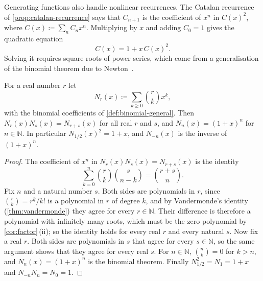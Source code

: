 Generating functions also handle nonlinear recurrences. The Catalan recurrence of \cref{prop:catalan-recurrence} says that $C_{n+1}$ is the coefficient of $x^n$ in $C(x)^2$, where $C(x)\coloneqq\sum_nC_nx^n$. Multiplying by $x$ and adding $C_0=1$ gives the quadratic equation
\begin{equation}
C(x)=1+x\,C(x)^2 .
\label{eq:catalan-gf}
\end{equation}
Solving it requires square roots of power series, which come from a generalisation of the binomial theorem due to Newton~\cite[Sects.~5.1 and~5.4]{graham1994concrete}.

\begin{theorem}
\label{thm:newton}
For a real number $r$ let
\[
N_r(x)\coloneqq\sum_{k\ge0}\binom rkx^k ,
\]
with the binomial coefficients of \cref{def:binomial-general}. Then $N_r(x)N_s(x)=N_{r+s}(x)$ for all real $r$ and $s$, and $N_n(x)=(1+x)^n$ for $n\in\mathbb N$. In particular $N_{1/2}(x)^2=1+x$, and $N_{-n}(x)$ is the inverse of $(1+x)^n$.
\end{theorem}

\begin{proof}
The coefficient of $x^n$ in $N_r(x)N_s(x)=N_{r+s}(x)$ is the identity
\[
\sum_{k=0}^{n}\binom rk\binom s{n-k}=\binom{r+s}{n}.
\]
Fix $n$ and a natural number $s$. Both sides are polynomials in $r$, since $\binom rk=r^{\underline k}/k!$ is a polynomial in $r$ of degree $k$, and by Vandermonde's identity (\cref{thm:vandermonde}) they agree for every $r\in\mathbb N$. Their difference is therefore a polynomial with infinitely many roots, which must be the zero polynomial by \cref{cor:factor}\,(ii); so the identity holds for every real $r$ and every natural $s$. Now fix a real $r$. Both sides are polynomials in $s$ that agree for every $s\in\mathbb N$, so the same argument shows that they agree for every real $s$. For $n\in\mathbb N$, $\binom nk=0$ for $k>n$, and $N_n(x)=(1+x)^n$ is the binomial theorem. Finally $N_{1/2}^2=N_1=1+x$ and $N_{-n}N_n=N_0=1$.
\end{proof}

